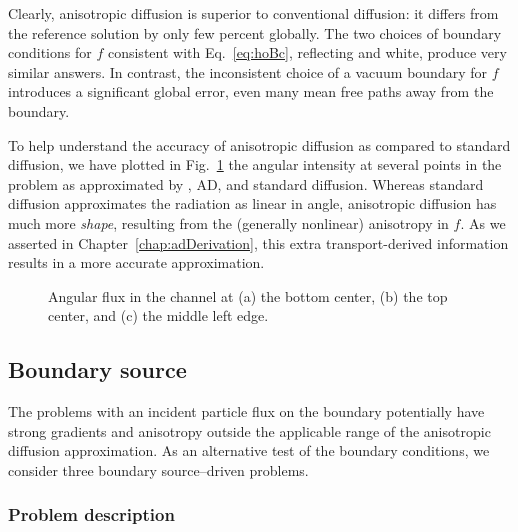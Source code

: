 Clearly, anisotropic diffusion is superior to conventional diffusion: it differs
from the reference solution by only few percent globally. The two choices of
boundary conditions for $f$ consistent with Eq.~\eqref{eq:hoBc}, reflecting and
white, produce very similar answers. In contrast, the inconsistent choice of a
vacuum boundary for $f$ introduces a significant global error, even many mean
free paths away from the boundary.

To help understand the accuracy of anisotropic diffusion as compared to standard
diffusion, we have plotted in Fig.~\ref{fig:bcReactorAngular} the angular
intensity at several points in the problem as approximated by \SN, AD, and
standard diffusion. Whereas standard diffusion approximates the radiation as linear in
angle, anisotropic diffusion has much more \emph{shape}, resulting from the
(generally nonlinear)
anisotropy in $f$. As we asserted in Chapter~\ref{chap:adDerivation}, this extra
transport-derived information results in a more accurate approximation.

\begin{figure}[htb]
  \centering\small

  \caption{Angular flux in the channel at (a) the bottom center, (b) the top
  center, and (c) the middle left edge.}
  \label{fig:bcReactorAngular}
\end{figure}

\clearpage
\subsection{Boundary source}

The problems with an incident particle flux on the boundary potentially have
strong gradients and anisotropy outside the applicable range of the anisotropic
diffusion approximation. As an alternative test of the boundary conditions, we
consider three boundary source--driven problems.

\subsubsection{Problem description}

